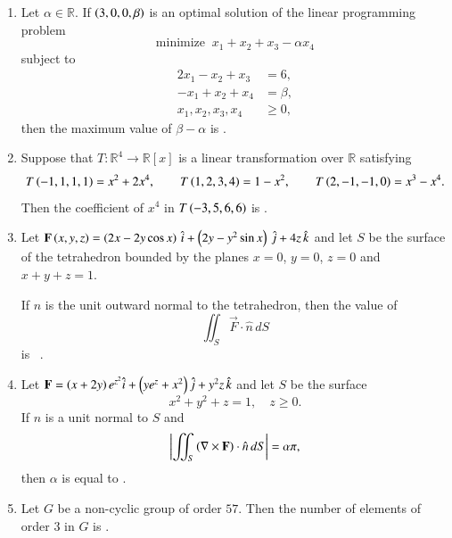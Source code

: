 \documentclass[journal,12pt,onecolumn]{IEEEtran}
\theoremstyle{remark}
\begin{document}
\begin{enumerate}[start=1, label=Q.\arabic*]
\hfill{}

\item Let $\alpha\in\mathbb{R}$. If $\left(3,0,0,\beta\right)$ is an optimal solution of the linear programming problem
\[
\text{minimize } \ x_1+x_2+x_3-\alpha x_4
\]
subject to
\begin{align*}
2x_1-x_2+x_3&=6,\\
-x_1+x_2+x_4&=\beta,\\
x_1,x_2,x_3,x_4&\ge 0,
\end{align*}
then the maximum value of $\beta-\alpha$ is \underline{\hspace{2cm}}.

\hfill{}

\item Suppose that $T\colon \mathbb{R}^{4}\to \mathbb{R}[x]$ is a linear transformation over $\mathbb{R}$ satisfying
\[
T\left(-1,1,1,1\right)=x^{2}+2x^{4},\qquad
T\left(1,2,3,4\right)=1-x^{2},\qquad
T\left(2,-1,-1,0\right)=x^{3}-x^{4}.
\]
Then the coefficient of $x^{4}$ in $T\left(-3,5,6,6\right)$ is \underline{\hspace{2cm}}.

\hfill{}
\item Let $\mathbf{F}\left(x,y,z\right) = \left(2x - 2y \cos x\right)\,\hat{i} + \left(2y - y^{2}\sin x\right)\,\hat{j} + 4z\,\hat{k}$ and let $S$ be the surface of the tetrahedron bounded by the planes $x=0$, $y=0$, $z=0$ and $x+y+z=1$.  

If $\hat{n}$ is the unit outward normal to the tetrahedron, then the value of
\[
\iint_{S} \vec{F}\cdot \hat{n}\, dS
\]
is \underline{\hspace{2cm}} \ .

\hfill{}


\item Let $\mathbf{F}=\left(x+2y\right)e^{z^{2}}\hat{i} + \left(y e^{z} + x^{2}\right)\hat{j} + y^{2}z\,\hat{k}$ and let $S$ be the surface 
\[
x^{2}+y^{2}+z=1,\quad z\ge 0.
\]
If $\hat{n}$ is a unit normal to $S$ and
\[
\left\vert\iint_{S} \left(\nabla \times \mathbf{F}\right)\cdot \hat{n}\, dS\right\vert=\alpha \pi,
\]
then $\alpha$ is equal to \underline{\hspace{2cm}}.

\hfill{}


\item Let $G$ be a non-cyclic group of order $57$. Then the number of elements of order $3$ in $G$ is \underline{\hspace{2cm}}.


\end{enumerate}
\end{document}
